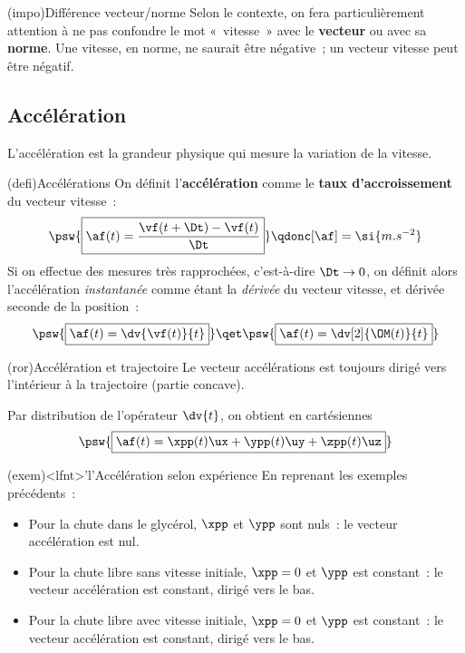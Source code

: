 \documentclass[../../main/main.tex]{subfiles}
\begin{document}
\begin{tcb}(impo){Différence vecteur/norme}
	Selon le contexte, on fera particulièrement attention à ne pas confondre le
	mot «~vitesse~» avec le \textbf{vecteur} ou avec sa \textbf{norme}. Une
	vitesse, en norme, ne saurait être négative~; un vecteur vitesse peut être
	négatif.
\end{tcb}

\subsection{Accélération}
L'accélération est la grandeur physique qui mesure la variation de la vitesse.
\begin{tcb}(defi){Accélérations}
	On définit l'\textbf{accélération} comme le \textbf{taux d'accroissement} du
	vecteur vitesse~:
	\[\psw{\boxed{\af(t) = \frac{\vf(t+\Dt) - \vf(t)}{\Dt}}}
		\qdonc
		[\af] = \si{m.s^{-2}}\]
	Si on effectue des mesures très rapprochées, c'est-à-dire $\Dt \rightarrow
		0$, on définit alors l'accélération \textit{instantanée} comme étant la
	\textit{dérivée} du vecteur vitesse, et dérivée seconde de la position~:
	\[\psw{\boxed{\af(t) = \dv{\vf(t)}{t}}}
		\qet
		\psw{\boxed{\af(t) = \dv[2]{\OM(t)}{t}}}\]
\end{tcb}

\begin{tcb}(ror){Accélération et trajectoire}
	Le vecteur accélérations est toujours dirigé vers l'intérieur à la
	trajectoire (partie concave).
\end{tcb}

Par distribution de l'opérateur $\dv{t}$, on obtient en cartésiennes
\[\psw{\boxed{\af(t) = \xpp(t)\ux + \ypp(t)\uy + \zpp(t)\uz}}\]

\begin{tcb}(exem)<lfnt>'l'{Accélération selon expérience}
	En reprenant les exemples précédents~:
	\begin{itemize}
		\item Pour la chute dans le glycérol, $\xpp$ et $\ypp$ sont nuls~: le
		      vecteur accélération est nul.
		\item Pour la chute libre sans vitesse initiale, $\xpp = 0$ et $\ypp$
		      est constant~: le vecteur accélération est constant, dirigé vers le
		      bas.
		\item Pour la chute libre avec vitesse initiale, $\xpp = 0$ et $\ypp$
		      est constant~: le vecteur accélération est constant, dirigé vers le
		      bas.
	\end{itemize}
\end{tcb}
\end{document}
